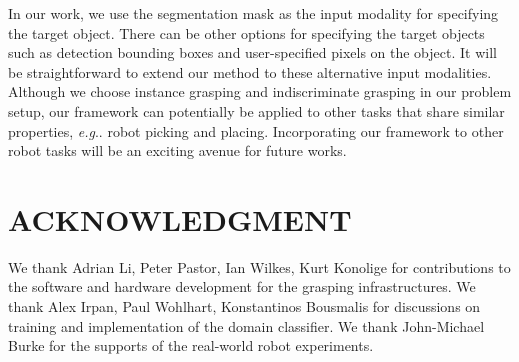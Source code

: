 \documentclass[letterpaper, 10 pt, conference]{ieeeconf}  %
\makeatletter
\DeclareRobustCommand\onedot{\futurelet\@let@token\@onedot}
\def\@onedot{\ifx\@let@token.\else.\null\fi\xspace}
\def\eg{\emph{e.g}\onedot} \def\Eg{\emph{E.g}\onedot}
\makeatother
\begin{document}
In our work, we use the segmentation mask as the input modality for specifying the target object. There can be other options for specifying the target objects such as detection bounding boxes and user-specified pixels on the object. It will be straightforward to extend our method to these alternative input modalities. Although we choose instance grasping and indiscriminate grasping in our problem setup, our framework can potentially be applied to other tasks that share similar properties, \eg robot picking and placing. Incorporating our framework to other robot tasks will be an exciting avenue for future works. 



\section*{ACKNOWLEDGMENT}
We thank Adrian Li, Peter Pastor, Ian Wilkes, Kurt Konolige for contributions to the software and hardware development for the grasping infrastructures. We thank Alex Irpan, Paul Wohlhart, Konstantinos Bousmalis for discussions on training and implementation of the domain classifier. We thank John-Michael Burke for the supports of the real-world robot experiments.

\addtolength{\textheight}{-12cm}   %

% 
% 
\end{document}
